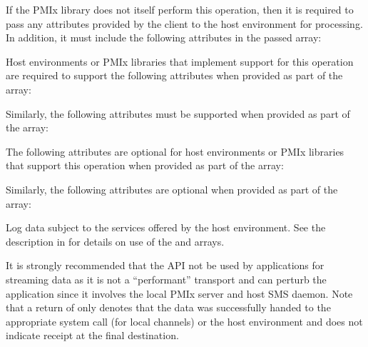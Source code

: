 \reqattrstart
If the \ac{PMIx} library does not itself perform this operation, then it is required to pass any attributes provided by the client to the host environment for processing. In addition, it must include the following attributes in the passed  array:


Host environments or \ac{PMIx} libraries that implement support for this operation are required to support the following attributes when provided as part of the  array:


Similarly, the following attributes must be supported when provided as part of the  array:


\reqattrend

\optattrstart
The following attributes are optional for host environments or \ac{PMIx} libraries that support this operation when provided as part of the  array:


Similarly, the following attributes are optional when provided as part of the  array:



\optattrend

\descr

Log data subject to the services offered by the host environment. See the description in  for details on use of the  and  arrays.

\adviceuserstart
It is strongly recommended that the  API not be used by applications for streaming data as it is not a ``performant'' transport and can perturb the application since it involves the local \ac{PMIx} server and host \ac{SMS} daemon. Note that a return of  only denotes that the data was successfully handed to the appropriate system call (for local channels) or the host environment and does not indicate receipt at the final destination.
\adviceuserend


